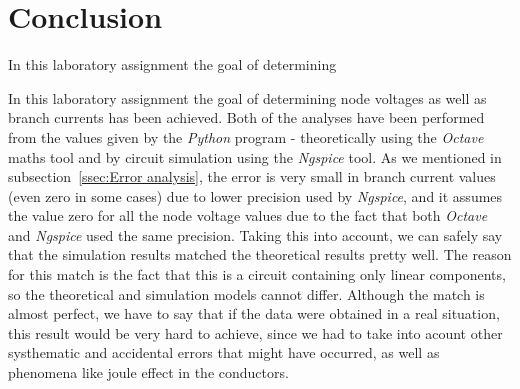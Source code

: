 \section{Conclusion}
\label{sec:conclusion}

\par In this laboratory assignment the goal of determining




\par In this laboratory assignment the goal of determining node voltages as well as branch currents has been achieved. Both of the analyses have been performed from the values given by the \emph{Python} program - theoretically using the \emph{Octave} maths tool and by circuit simulation using the \emph{Ngspice} tool. As we mentioned in subsection~\ref{ssec:Error analysis}, the error is very small in branch current values (even zero in some cases) due to lower precision used by \emph{Ngspice}, and it assumes the value zero for all the node voltage values due to the fact that both \emph{Octave} and \emph{Ngspice} used the same precision. Taking this into account, we can safely say that the simulation results matched the theoretical results pretty well. The reason for this match is the fact that this is a circuit containing only linear components, so the theoretical and simulation models cannot differ. Although the match is almost perfect, we have to say that if the data were obtained in a real situation, this result would be very hard to achieve, since we had to take into acount other systhematic and accidental errors that might have occurred, as well as phenomena like joule effect in the conductors.  

